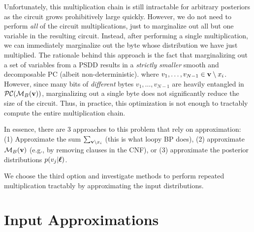 Unfortunately, this multiplication chain is still intractable for arbitrary posteriors as the circuit grows prohibitively large quickly. However, we do not need to perform \textit{all} of the circuit multiplications, just to marginalize out all but one variable in the resulting circuit. Instead, after performing a single multiplication, we can immediately marginalize out the byte whose distribution we have just multiplied. The rationale behind this approach is the fact that marginalizing out a set of variables from a PSDD results in a \textit{strictly smaller} smooth and decomposable PC (albeit non-deterministic).
\noindent
{}
where $v_1,\dots,v_{N-1} \in \mathbf{v} \setminus x_i$.
However, since many bits of \textit{different} bytes $v_1,\dots,v_{N-1}$ are heavily entangled in $\mathcal{PC}(\mathcal{M}_B(\mathbf{v}))$, marginalizing out a single byte does not significantly reduce the size of the circuit. Thus, in practice, this optimization is not enough to tractably compute the entire multiplication chain. 

In essence, there are 3 approaches to this problem that rely on approximation: (1) Approximate the sum $\sum_{\mathbf{v} \setminus x_i}$ (this is what loopy BP does), (2) approximate $\mathcal{M}_B(\mathbf{v})$ (e.g., by removing clauses in the CNF), or (3) approximate the posterior distributions $p(v_j | \boldsymbol{\ell})$.

We choose the third option and investigate methods to perform repeated multiplication tractably by approximating the input distributions.




\section{Input Approximations}

